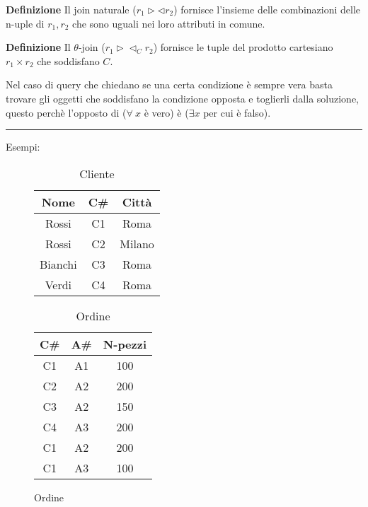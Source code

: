 \documentclass{article}
\begin{document}
\noindent\textbf{Definizione} Il join naturale ($r_1\triangleright\triangleleft r_2$) fornisce l'insieme delle combinazioni delle n-uple di $r_1,r_2$ che sono uguali nei loro attributi in comune.\newline

\noindent\textbf{Definizione} Il $\theta$-join ($r_1\triangleright\triangleleft_C r_2$) fornisce le tuple del prodotto cartesiano $r_1\times r_2$ che soddisfano $C$.\newline

\noindent Nel caso di query che chiedano se una certa condizione è sempre vera basta trovare gli oggetti che soddisfano la condizione opposta e toglierli dalla soluzione, questo perchè l'opposto di ($\forall\ x$ è vero) è ($\exists x$ per cui è falso).\newline

\noindent\rule{\textwidth}{0.5pt}
Esempi:

\begin{figure}[ht]
    \begin{minipage}[t]{0.49\textwidth}
    \centering
        \begin{table}[H]
        \centering
            \begin{tabular}{c|c|c}
                \textbf{Nome} & \textbf{C\#} & \textbf{Città}\\
                \hline
                Rossi & C1 & Roma\\
                \hline
                Rossi & C2 & Milano\\
                \hline
                Bianchi & C3 & Roma\\
                \hline
                Verdi & C4 & Roma\\
            \end{tabular}
            \caption*{Cliente}
        \end{table} 
    \end{minipage}
    \begin{minipage}[t]{0.49\textwidth}
    \centering
        \begin{table}[H]
        \centering
        \begin{tabular}{c|c|c}
            \textbf{C\#} & \textbf{A\#} & \textbf{N-pezzi}\\
            \hline
            C1 & A1 & 100\\
            \hline
            C2 & A2 & 200\\
            \hline
            C3 & A2 & 150\\
            \hline
            C4 & A3 & 200\\
            \hline
            C1 & A2 & 200\\
            \hline
            C1 & A3 & 100\\
        \end{tabular}
        \caption*{Ordine}
    \end{table}
\end{minipage}
\end{figure}
\end{document}
